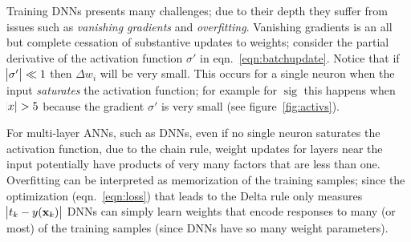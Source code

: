 Training DNNs presents many challenges; due to their depth they suffer from issues such as \textit{vanishing gradients} and \textit{overfitting}.
%
Vanishing gradients is an all but complete cessation of substantive updates to weights; consider the partial derivative of the activation function \(\sigma'\) in eqn.~\eqref{eqn:batchupdate}.
%
Notice that if \(\abs{\sigma'} \ll 1\) then \(\Delta w_i\) will be very small. 
%
This occurs for a single neuron when the input \textit{saturates} the activation function; for example for \(\operatorname{sig}\) this happens when \(\abs{x} > 5\) because the gradient \(\sigma'\) is very small (see figure~\ref{fig:activs}).

%
For multi-layer ANNs, such as DNNs, even if no single neuron saturates the activation function, 
due to the chain rule, weight updates for layers near the input potentially have products of very many factors that are less than one.
%
Overfitting can be interpreted as memorization of the training samples; since the optimization (eqn.~\eqref{eqn:loss}) that leads to the Delta rule only measures \(\abs{t_k - y(\mathbf{x}_k)}\) DNNs can simply learn weights that encode responses to many (or most) of the training samples (since DNNs have so many weight parameters). 

